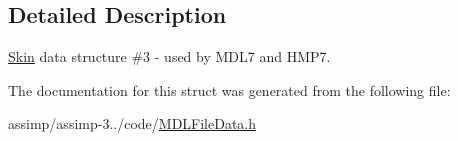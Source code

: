 \subsection{Detailed Description}
\hyperlink{struct_assimp_1_1_m_d_l_1_1_skin}{Skin} data structure \#3 -\/ used by M\+D\+L7 and H\+M\+P7. 

The documentation for this struct was generated from the following file\+:\begin{DoxyCompactItemize}
\item 
assimp/assimp-\/3../code/\hyperlink{_m_d_l_file_data_8h}{M\+D\+L\+File\+Data.\+h}\end{DoxyCompactItemize}
